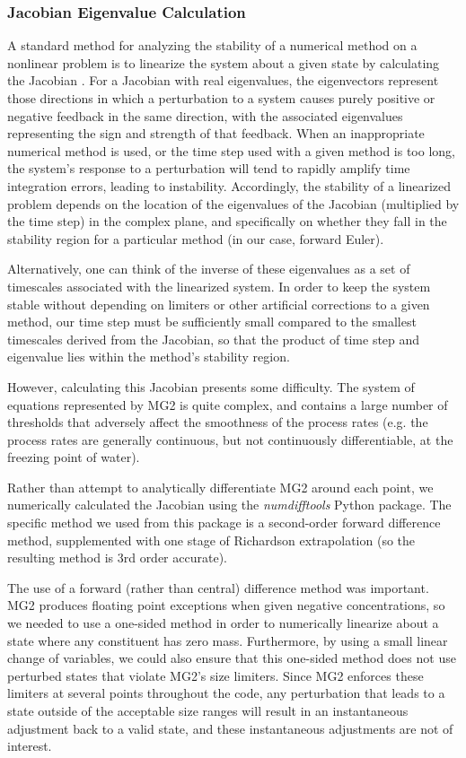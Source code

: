 \documentclass [11pt, proquest] {uwthesis}[2020/02/24]
\begin{document}
\subsubsection{Jacobian Eigenvalue Calculation}

A standard method for analyzing the stability of a numerical method on a nonlinear problem is to linearize the system about a given state by calculating the Jacobian \parencite{RJL-FDM}. For a Jacobian with real eigenvalues, the eigenvectors represent those directions in which a perturbation to a system causes purely positive or negative feedback in the same direction, with the associated eigenvalues representing the sign and strength of that feedback. When an inappropriate numerical method is used, or the time step used with a given method is too long, the system's response to a perturbation will tend to rapidly amplify time integration errors, leading to instability. Accordingly, the stability of a linearized problem depends on the location of the eigenvalues of the Jacobian (multiplied by the time step) in the complex plane, and specifically on whether they fall in the stability region for a particular method (in our case, forward Euler).

Alternatively, one can think of the inverse of these eigenvalues as a set of timescales associated with the linearized system. In order to keep the system stable without depending on limiters or other artificial corrections to a given method, our time step must be sufficiently small compared to the smallest timescales derived from the Jacobian, so that the product of time step and eigenvalue lies within the method's stability region.

However, calculating this Jacobian presents some difficulty. The system of equations represented by MG2 is quite complex, and contains a large number of thresholds that adversely affect the smoothness of the process rates (e.g. the process rates are generally continuous, but not continuously differentiable, at the freezing point of water).

Rather than attempt to analytically differentiate MG2 around each point, we numerically calculated the Jacobian using the \emph{numdifftools} Python package. The specific method we used from this package is a second-order forward difference method, supplemented with one stage of Richardson extrapolation (so the resulting method is 3rd order accurate).

The use of a forward (rather than central) difference method was important. MG2 produces floating point exceptions when given negative concentrations, so we needed to use a one-sided method in order to numerically linearize about a state where any constituent has zero mass. Furthermore, by using a small linear change of variables, we could also ensure that this one-sided method does not use perturbed states that violate MG2's size limiters. Since MG2 enforces these limiters at several points throughout the code, any perturbation that leads to a state outside of the acceptable size ranges will result in an instantaneous adjustment back to a valid state, and these instantaneous adjustments are not of interest.
\end{document}
